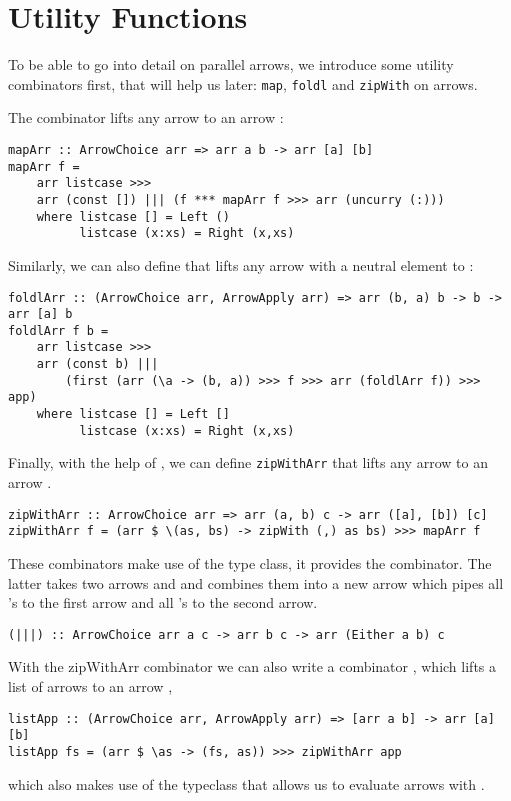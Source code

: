 \section{Utility Functions}\label{utilfns}
To be able to go into detail on parallel arrows, we introduce some utility combinators first, that will help us later: \lstinline{map}, \lstinline{foldl} and \lstinline{zipWith} on arrows.

The  combinator lifts any arrow  to an arrow  \cite{programming_with_arrows}:
\begin{lstlisting}[frame=htrbl]
mapArr :: ArrowChoice arr => arr a b -> arr [a] [b]
mapArr f =
	arr listcase >>>
	arr (const []) ||| (f *** mapArr f >>> arr (uncurry (:)))
	where listcase [] = Left ()
	      listcase (x:xs) = Right (x,xs)
\end{lstlisting}
Similarly, we can also define  that lifts any arrow  with a neutral element  to :
\begin{lstlisting}[frame=htrbl]
foldlArr :: (ArrowChoice arr, ArrowApply arr) => arr (b, a) b -> b -> arr [a] b
foldlArr f b =
	arr listcase >>>
	arr (const b) |||
		(first (arr (\a -> (b, a)) >>> f >>> arr (foldlArr f)) >>> app)
	where listcase [] = Left []
	      listcase (x:xs) = Right (x,xs)
\end{lstlisting}
Finally, with the help of , we can define \lstinline{zipWithArr} that lifts any arrow  to an arrow .
\begin{lstlisting}[frame=htrbl]
zipWithArr :: ArrowChoice arr => arr (a, b) c -> arr ([a], [b]) [c]
zipWithArr f = (arr $ \(as, bs) -> zipWith (,) as bs) >>> mapArr f
\end{lstlisting} %
These combinators make use of the  type class, it provides the \code{|||} combinator. The latter takes two arrows  and  and combines them into a new arrow  which pipes all 's to the first arrow and all 's to the second arrow.
\begin{lstlisting}[frame=htrbl]
(|||) :: ArrowChoice arr a c -> arr b c -> arr (Either a b) c
\end{lstlisting}
With the zipWithArr combinator we can also write a combinator , which lifts a list of arrows \code{[arr a b]} to an arrow ,
\begin{lstlisting}[frame=htrbl]
listApp :: (ArrowChoice arr, ArrowApply arr) => [arr a b] -> arr [a] [b]
listApp fs = (arr $ \as -> (fs, as)) >>> zipWithArr app
\end{lstlisting}%
which also makes use of the  typeclass that allows us to evaluate arrows with .

